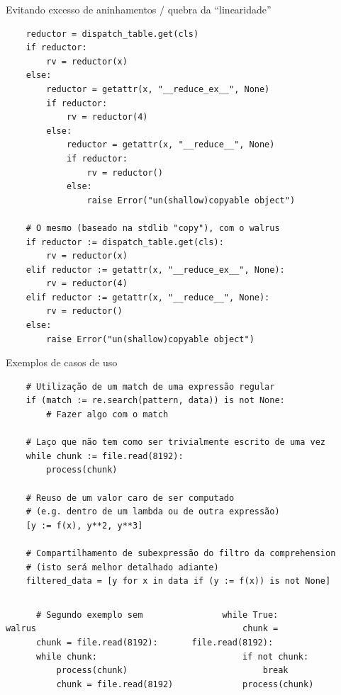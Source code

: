 \documentclass[utf8]{beamer}
\begin{document}
\begin{frame}[fragile]{Evitando excesso de aninhamentos /
                       quebra da ``linearidade''}
  \vspace{-1em}
  \begin{verbatim}
    reductor = dispatch_table.get(cls)
    if reductor:
        rv = reductor(x)
    else:
        reductor = getattr(x, "__reduce_ex__", None)
        if reductor:
            rv = reductor(4)
        else:
            reductor = getattr(x, "__reduce__", None)
            if reductor:
                rv = reductor()
            else:
                raise Error("un(shallow)copyable object")

    # O mesmo (baseado na stdlib "copy"), com o walrus
    if reductor := dispatch_table.get(cls):
        rv = reductor(x)
    elif reductor := getattr(x, "__reduce_ex__", None):
        rv = reductor(4)
    elif reductor := getattr(x, "__reduce__", None):
        rv = reductor()
    else:
        raise Error("un(shallow)copyable object")
  \end{verbatim}
\end{frame}


\begin{frame}[fragile]{Exemplos de casos de uso}
  \vspace{-1em}
  \begin{verbatim}
    # Utilização de um match de uma expressão regular
    if (match := re.search(pattern, data)) is not None:
        # Fazer algo com o match

    # Laço que não tem como ser trivialmente escrito de uma vez
    while chunk := file.read(8192):
        process(chunk)

    # Reuso de um valor caro de ser computado
    # (e.g. dentro de um lambda ou de outra expressão)
    [y := f(x), y**2, y**3]

    # Compartilhamento de subexpressão do filtro da comprehension
    # (isto será melhor detalhado adiante)
    filtered_data = [y for x in data if (y := f(x)) is not None]
  \end{verbatim}
  \vfill
  \vspace{-1em}
  \begin{columns}
    \begin{verbatim}
      # Segundo exemplo sem walrus
      chunk = file.read(8192):
      while chunk:
          process(chunk)
          chunk = file.read(8192)
    \end{verbatim}

    \begin{verbatim}
      while True:
          chunk = file.read(8192):
          if not chunk:
              break
          process(chunk)
    \end{verbatim}
  \end{columns}
\end{frame}
\end{document}
